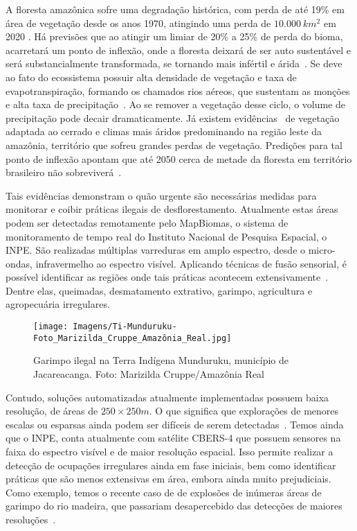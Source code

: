 A floresta amazônica sofre uma degradação histórica, com perda de até 19\% em área de vegetação desde os anos 1970, atingindo uma perda de \( 10.000~km^2 \) em 2020 \cite{ignacioNature}. Há previsões que ao atingir um limiar de 20\% a 25\% de perda do bioma, acarretará um ponto de inflexão, onde a floresta deixará de ser auto sustentável e será substancialmente transformada, se tornando mais infértil e árida~\cite{LovejoyTipping}. Se deve ao fato do ecossistema possuir alta densidade de vegetação e  taxa de evapotranspiração, formando os chamados rios aéreos, que sustentam as monções e alta taxa de precipitação~\cite{satyamurty2013moisture}. Ao se remover a vegetação desse ciclo, o volume de  precipitação pode decair dramaticamente. Já existem evidências~\cite{ignacioNature} de vegetação adaptada ao cerrado e climas mais áridos predominando na região leste da amazônia, território que sofreu grandes perdas de vegetação. Predições para tal ponto de inflexão apontam que até 2050 cerca de metade da floresta em território brasileiro não sobreviverá~\cite{LovejoyTipping}.

Tais evidências demonstram o quão urgente são necessárias medidas para monitorar e coibir práticas ilegais de desflorestamento. Atualmente estas áreas podem ser detectadas remotamente pelo MapBiomas, o sistema de monitoramento de tempo real do Instituto Nacional de Pesquisa Espacial, o INPE. São realizadas múltiplas varreduras em amplo espectro, desde o micro-ondas, infravermelho ao espectro visível. Aplicando técnicas de fusão sensorial, é possível identificar as regiões onde tais práticas acontecem extensivamente~\cite{inpe_deter}. Dentre elas, queimadas, desmatamento extrativo, garimpo, agricultura e agropecuária irregulares.
\begin{figure}[h!]
 \centering
 \texttt{[image: Imagens/Ti-Munduruku-Foto\_Marizilda\_Cruppe\_Amazônia\_Real.jpg]}
 \caption{Garimpo ilegal na Terra Indígena Munduruku, município de Jacareacanga.
 Foto: Marizilda Cruppe/Amazônia Real}
\label{fig:garimpo}
\end{figure}
Contudo, soluções automatizadas atualmente implementadas possuem baixa resolução, de áreas de \(250\times250m\). O que significa que explorações de menores escalas ou esparsas ainda podem ser difíceis de serem detectadas~\cite{mapbiomasgarimpo}. Temos ainda que o INPE, conta atualmente com satélite CBERS-4 que possuem sensores na faixa do espectro visível e de maior resolução espacial. Isso permite realizar a detecção de ocupações irregulares ainda em fase iniciais, bem como identificar práticas que são menos extensivas em área, embora ainda muito prejudiciais. Como exemplo, temos o recente caso de de explosões de inúmeras áreas de garimpo do rio madeira, que passariam desapercebido das detecções de maiores resoluções~\cite{mapbiomasgarimpo}.


